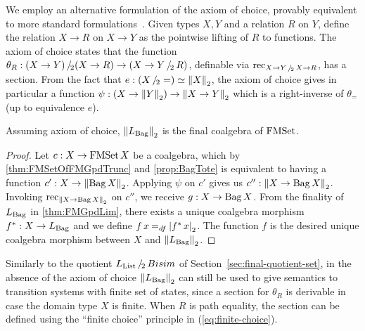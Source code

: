 \documentclass[a4paper,USenglish,cleveref]{lipics-v2021}
\begin{document}
We employ an alternative formulation of the axiom of choice, provably equivalent to more standard formulations~\cite{Veltri2021}. Given types $X,Y$ and a relation $R$ on $Y$, define the relation $X \to R$ on $X \to Y$ as the pointwise lifting of $R$ to functions. The axiom of choice states that the function $\theta_R : \SetQuot[(X \to Y)][(X \to R)] \to (X \to \SetQuot[Y][R])$, definable via $\Rec{\SetQuot[X \to Y][X \to R]}$, has a section. From the fact that $e : (\SetQuot[X][{=}]) \simeq \SetTrunc{X}$, the axiom of choice gives in particular a function $\psi : (X \to \SetTrunc{Y}) \to \SetTrunc{X \to Y}$ which is a right-inverse of $\theta_{=}$ (up to equivalence $e$).
\begin{theorem}\label{thm:final-set-truncation}
  Assuming axiom of choice, $\SetTrunc{\Lim{\Bag}}$ is the final coalgebra of $\FMSet$.
\end{theorem}
\begin{proof}
Let $c : X \to \FMSet X$ be a coalgebra, which by \cref{thm:FMSetOfFMGpdTrunc} and \cref{prop:BagTote} is equivalent to having a function $c' : X \to \SetTrunc{\Bag X}$. Applying $\psi$ on $c'$ gives us $c'' : \SetTrunc{X \to \Bag X}$. Invoking $\Rec{\SetTrunc{X \to \Bag X}}$ on $c''$, we receive $g : X \to \Bag X$. From the finality of $\Lim{\Bag}$ in \cref{thm:FMGpdLim}, there exists a unique coalgebra morphism $f^* : X \to \Lim{\Bag}$ and we define $f\,x \DefEq \SetTruncCon[f^*\,x]$. The function $f$ is the desired unique coalgebra morphism between $X$ and $\SetTrunc{\Lim{\Bag}}$.
\end{proof}
Similarly to the quotient $\SetQuot[\Lim{\List}][\Bisim]$ of Section~\ref{sec:final-quotient-set}, in the absence of the axiom of choice $\SetTrunc{\Lim{\Bag}}$ can still be used to give semantics to transition systems with finite set of states, since a section for $\theta_{R}$ is derivable in case the domain type $X$ is finite. When $R$ is path equality, the section can be defined using the \enquote{finite choice} principle in (\ref{eq:finite-choice}).

\end{document}
